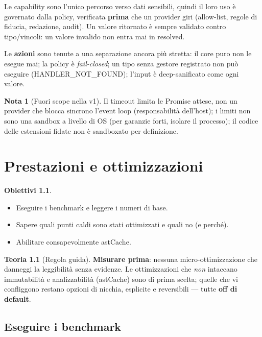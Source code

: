 \documentclass[11pt,a4paper]{book}
\newcommand{\ic}[1]{{\ttfamily #1}}
\theoremstyle{definition}
\newtheorem*{obiettivi}{Obiettivi}
\newtheorem*{nota}{Nota}
\newtheorem*{teoria}{Teoria}
\begin{document}
{{{{Le capability sono l'unico percorso verso dati sensibili, quindi il loro uso è
governato dalla \ic{policy}, verificata \textbf{prima} che un provider giri
(allow-list, regole di fiducia, redazione, audit). Un valore ritornato è sempre
validato contro tipo/vincoli: un valore invalido non entra mai in \ic{resolved}.

Le \textbf{azioni} sono tenute a una separazione ancora più stretta: il core puro
non le esegue mai; la policy è \emph{fail-closed}; un tipo senza gestore registrato
non può eseguire (\ic{HANDLER\_NOT\_FOUND}); l'\ic{input} è deep-sanificato come ogni
valore.

\begin{nota}[Fuori scope nella v1]
Il timeout limita le Promise attese, non un provider che blocca sincrono l'event
loop (responsabilità dell'host); i limiti non sono una sandbox a livello di OS (per
garanzie forti, isolare il processo); il codice delle estensioni fidate non è
sandboxato per definizione.
\end{nota}

\chapter{Prestazioni e ottimizzazioni}
\label{ch:prestazioni}

\begin{obiettivi}
\begin{itemize}
  \item Eseguire i benchmark e leggere i numeri di base.
  \item Sapere quali punti caldi sono stati ottimizzati e quali no (e perché).
  \item Abilitare consapevolmente \ic{astCache}.
\end{itemize}
\end{obiettivi}

\begin{teoria}[Regola guida]
\textbf{Misurare prima}: nessuna micro-ottimizzazione che danneggi la leggibilità
senza evidenze. Le ottimizzazioni che \emph{non} intaccano immutabilità e
analizzabilità (\ic{astCache}) sono di prima scelta; quelle che vi confliggono
restano opzioni di nicchia, esplicite e reversibili --- tutte \textbf{off di
default}.
\end{teoria}

\section{Eseguire i benchmark}

}}}}
\end{document}

